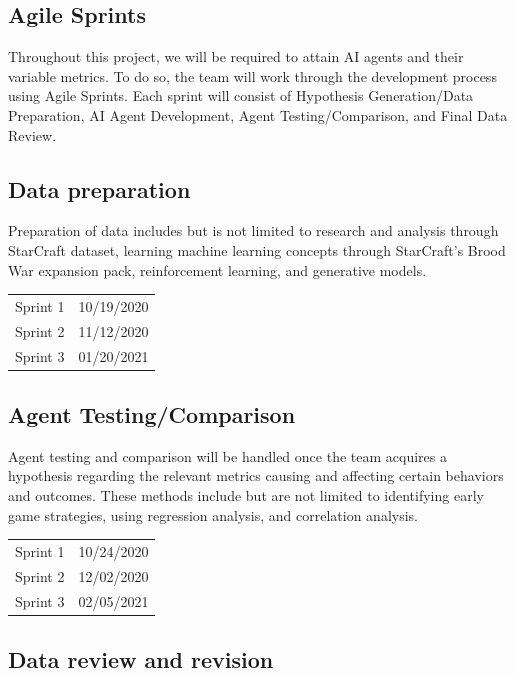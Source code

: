 \documentclass[a4paper,12pt]{report}
\begin{document}
\subsection{Agile Sprints}

Throughout this project, we will be required to attain AI agents and their variable metrics. To do so, the team will work through the development process using Agile Sprints. Each sprint will consist of Hypothesis Generation/Data Preparation, AI Agent Development, Agent Testing/Comparison, and Final Data Review.

\subsection{Data preparation}

Preparation of data includes but is not limited to research and analysis through StarCraft dataset, learning machine learning concepts through StarCraft’s Brood War expansion pack, reinforcement learning, and generative models.

\begin{center}\begin{tabular}{ll}
Sprint 1 & 10/19/2020 \\
Sprint 2 & 11/12/2020 \\
Sprint 3 & 01/20/2021
\end{tabular}\end{center}

\subsection{Agent Testing/Comparison}

Agent testing and comparison will be handled once the team acquires a hypothesis regarding the relevant metrics causing and affecting certain behaviors and outcomes. These methods include but are not limited to identifying early game strategies, using regression analysis, and correlation analysis.


\begin{center}\begin{tabular}{ll}
Sprint 1 & 10/24/2020 \\
Sprint 2 & 12/02/2020 \\
Sprint 3 & 02/05/2021
\end{tabular}\end{center}

\subsection{Data review and revision}
\end{document}
